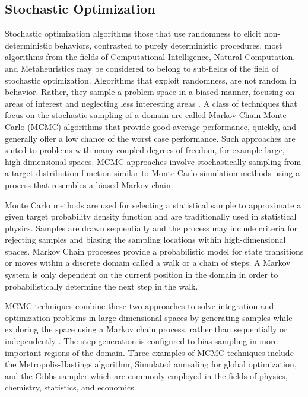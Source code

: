 \documentclass[a4paper, 11pt]{article}
\begin{document}
\subsection{Stochastic Optimization}
\label{subsec:stochastic}
Stochastic optimization algorithms those that use randomness to elicit non-deterministic behaviors, contrasted to purely deterministic procedures. 
most algorithms from the fields of Computational Intelligence, Natural Computation, and Metaheuristics may be considered to belong to sub-fields of the field of stochastic optimization. Algorithms that exploit randomness, are not random in behavior. Rather, they sample a problem space in a biased manner, focusing on areas of interest and neglecting less interesting areas \cite{Spall2003}. 
A class of techniques that focus on the stochastic sampling of a domain are called Markov Chain Monte Carlo (MCMC) algorithms that provide good average performance, quickly, and generally offer a low chance of the worst case performance. Such approaches are suited to problems with many coupled degrees of freedom, for example large, high-dimensional spaces. MCMC approaches involve stochastically sampling from a target distribution function similar to Monte Carlo simulation methods using a process that resembles a biased Markov chain.

Monte Carlo methods are used for selecting a statistical sample to approximate a given target probability density function and are traditionally used in statistical physics. Samples are drawn sequentially and the process may include criteria for rejecting samples and biasing the sampling locations within high-dimensional spaces. 
Markov Chain processes provide a probabilistic model for state transitions or moves within a discrete domain called a walk or a chain of steps. A Markov system is only dependent on the current position in the domain in order to probabilistically determine the next step in the walk. 

MCMC techniques combine these two approaches to solve integration and optimization problems in large dimensional spaces by generating samples while exploring the space using a Markov chain process, rather than sequentially or independently \cite{Andrieu2003}. The step generation is configured to bias sampling in more important regions of the domain. Three examples of MCMC techniques include the Metropolis-Hastings algorithm, Simulated annealing for global optimization, and the Gibbs sampler which are commonly employed in the fields of physics, chemistry, statistics, and economics. 
\end{document}
